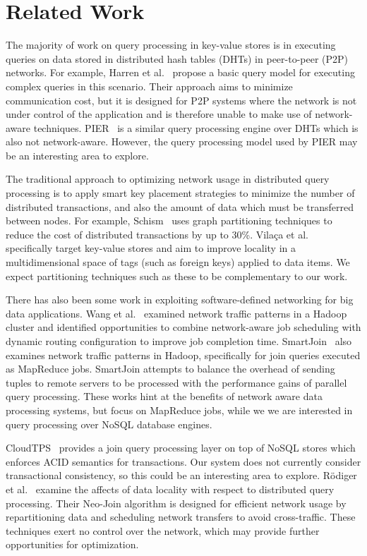 \documentclass{acm_proc_article-sp}
\begin{document}
\section{Related Work}

The majority of work on query processing in key-value stores is in executing queries on data stored in distributed hash tables (DHTs) in peer-to-peer (P2P) networks.
For example, Harren et al.~\cite{Harren2002} propose a basic query model for executing complex queries in this scenario.
Their approach aims to minimize communication cost, but it is designed for P2P systems where the network is not under control of the application and is therefore unable to make use of network-aware techniques.
PIER~\cite{Huebsch2005} is a similar query processing engine over DHTs which is also not network-aware.
However, the query processing model used by PIER may be an interesting area to explore.

The traditional approach to optimizing network usage in distributed query processing is to apply smart key placement strategies to minimize the number of distributed transactions, and also the amount of data which must be transferred between nodes.
For example, Schism~\cite{Curino2010} uses graph partitioning techniques to reduce the cost of distributed transactions by up to 30\%.
Vila\c{c}a et al.~\cite{Vilaca2011} specifically target key-value stores and aim to improve locality in a multidimensional space of tags (such as foreign keys) applied to data items.
We expect partitioning techniques such as these to be complementary to our work.

There has also been some work in exploiting software-defined networking for big data applications.
Wang et al.~\cite{Wang2012} examined network traffic patterns in a Hadoop~\cite{Shvachko2010} cluster and identified opportunities to combine network-aware job scheduling with dynamic routing configuration to improve job completion time.
SmartJoin~\cite{Slagter2014} also examines network traffic patterns in Hadoop, specifically for join queries executed as MapReduce jobs.
SmartJoin attempts to balance the overhead of sending tuples to remote servers to be processed with the performance gains of parallel query processing.
These works hint at the benefits of network aware data processing systems, but focus on MapReduce jobs, while we we are interested in query processing over NoSQL database engines.

CloudTPS~\cite{Wei2012} provides a join query processing layer on top of NoSQL stores which enforces ACID semantics for transactions.
Our system does not currently consider transactional consistency, so this could be an interesting area to explore.
R\"{o}diger et al.~\cite{Rodiger2014} examine the affects of data locality with respect to distributed query processing.
Their Neo-Join algorithm is designed for efficient network usage by repartitioning data and scheduling network transfers to avoid cross-traffic.
These techniques exert no control over the network, which may provide further opportunities for optimization.
\end{document}
